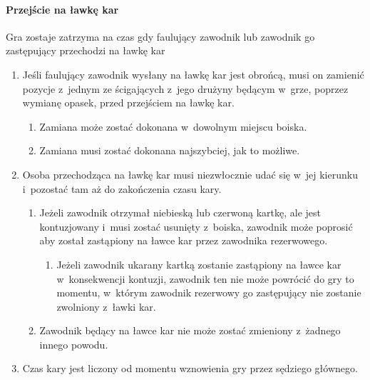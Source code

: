 \documentclass[12pt]{article}
\begin{document}
\paragraph{Przejście na ławkę kar}
Gra zostaje zatrzyma na czas
gdy faulujący zawodnik lub zawodnik go zastępujący przechodzi na ławkę
kar

\begin{enumerate}
	\item
	      Jeśli faulujący zawodnik wysłany na ławkę kar jest obrońcą, musi on
	      zamienić pozycje z~jednym ze ścigających z~jego drużyny będącym w~grze, poprzez wymianę opasek, przed przejściem na ławkę kar.

	      \begin{enumerate}
		      \item
		            Zamiana może zostać dokonana w~dowolnym miejscu boiska.
		      \item
		            Zamiana musi zostać dokonana najszybciej, jak to możliwe.
	      \end{enumerate}
	\item
	      Osoba przechodząca na ławkę kar musi niezwłocznie udać się w~jej
	      kierunku i~pozostać tam aż do zakończenia czasu kary.

	      \begin{enumerate}
		      \item
		            Jeżeli zawodnik otrzymał niebieską lub czerwoną kartkę, ale jest
		            kontuzjowany i~musi zostać usunięty z~boiska, zawodnik może poprosić
		            aby został zastąpiony na ławce kar przez zawodnika rezerwowego.

		            \begin{enumerate}
			            \item
			                  Jeżeli zawodnik ukarany kartką zostanie zastąpiony na ławce kar w~konsekwencji kontuzji, zawodnik ten nie może powrócić do gry to
			                  momentu, w~którym zawodnik rezerwowy go zastępujący nie zostanie
			                  zwolniony z~ławki kar.
		            \end{enumerate}
		      \item
		            Zawodnik będący na ławce kar nie może zostać zmieniony z~żadnego
		            innego powodu.
	      \end{enumerate}
	\item
	      Czas kary jest liczony od momentu wznowienia gry przez sędziego
	      głównego.
\end{enumerate}
\end{document}
